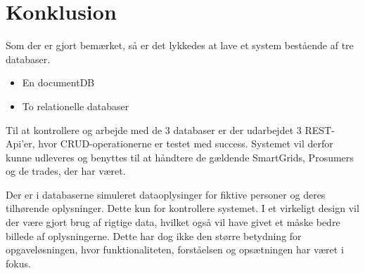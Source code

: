
\section{Konklusion}

Som der er gjort bemærket, så er det lykkedes at lave et system bestående af tre databaser.

\begin{itemize}
    \item En documentDB
    \item To relationelle databaser 
\end{itemize}

Til at kontrollere og arbejde med de 3 databaser er der udarbejdet 3 REST-Api'er, hvor CRUD-operationerne er testet med success.
Systemet vil derfor kunne udleveres og benyttes til at håndtere de gældende SmartGrids, Prosumers og de trades, der har været.

Der er i databaserne simuleret dataoplysinger for fiktive personer og deres tilhørende oplysninger. Dette kun for kontrollere systemet.
I et virkeligt design vil der være gjort brug af rigtige data, hvilket også vil have givet et måske bedre billede af oplysningerne. Dette har dog ikke den større betydning for opgaveløsningen, hvor funktionaliteten, forståelsen og opsætningen har været i fokus.